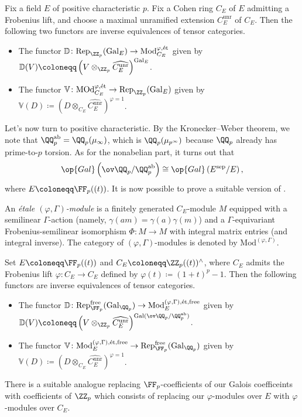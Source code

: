 \documentclass{article}
\begin{document}
\begin{theorem}
	Fix a field $E$ of positive characteristic $p$. Fix a Cohen ring $C_E$ of $E$ admitting a Frobenius lift, and choose a maximal unramified extension $C_E^{\mathrm{unr}}$ of $C_E$. Then the following two functors are inverse equivalences of tensor categories.
	\begin{itemize}
		\item The functor $\mathbb D\colon\mathrm{Rep}_{\ZZ_p}(\mathrm{Gal}_E)\to\mathrm{Mod}_{C_E}^{\varphi,\mathrm{\acute et}}$ given by $\mathbb D(V)\coloneqq\left(V\otimes_{\ZZ_p}\widehat{C_E^{\mathrm{unr}}}\right)^{\mathrm{Gal}_E}$.
		\item The functor $\mathbb V\colon\mathrm{MOd}_{C_E}^{\varphi,\mathrm{\acute et}}\to\mathrm{Rep}_{\ZZ_p}(\mathrm{Gal}_E)$ given by $\mathbb V(D)\coloneqq\left(D\otimes_{C_E}\widehat{C_E^{\mathrm{unr}}}\right)^{\varphi=1}$.
	\end{itemize}
\end{theorem}
Let's now turn to positive characteristic. By the Kronecker--Weber theorem, we note that $\QQ_p^{\mathrm{ab}}=\QQ_p(\mu_\infty)$, which is $\QQ_p(\mu_{p^\infty})$ because $\QQ_p$ already has prime-to-$p$ torsion. As for the nonabelian part, it turns out that
\[\op{Gal}\left(\ov\QQ_p/\QQ_p^{\mathrm{ab}}\right)\cong\op{Gal}\left(E^{\mathrm{sep}}/E\right),\]
where $E\coloneqq\FF_p((t))$. It is now possible to prove a suitable version of .
\begin{definition}
	An \textit{\'etale $(\varphi,\Gamma)$-module} is a finitely generated $C_E$-module $M$ equipped with a semilinear $\Gamma$-action (namely, $\gamma(am)=\gamma(a)\gamma(m)$) and a $\Gamma$-equivariant Frobenius-semilinear isomorphism $\Phi\colon M\to M$ with integral matrix entries (and integral inverse). The category of $(\varphi,\Gamma)$-mod\-ules is denoted by $\mathrm{Mod}^{(\varphi,\Gamma)}$.
\end{definition}
\begin{theorem}
	Set $E\coloneqq\FF_p((t))$ and $C_E\coloneqq\ZZ_p((t))^{\land}$, where $C_E$ admits the Frobenius lift $\varphi\colon C_E\to C_E$ defined by $\varphi(t)\coloneqq(1+t)^p-1$. Then the following functors are inverse equivalences of tensor categories.
	\begin{itemize}
		\item The functor $\mathbb D\colon\mathrm{Rep}_{\FF_p}^{\mathrm{free}}(\mathrm{Gal}_{\QQ_p})\to\mathrm{Mod}_E^{(\varphi,\Gamma),\mathrm{\acute et},\mathrm{free}}$ given by $\mathbb D(V)\coloneqq\left(V\otimes_{\ZZ_p}\widehat{C_E^{\mathrm{unr}}}\right)^{\mathrm{Gal}(\ov\QQ_p/\QQ_p^{\mathrm{ab}})}$.
		\item The functor $\mathbb V\colon\mathrm{Mod}_E^{(\varphi,\Gamma),\mathrm{\acute et},\mathrm{free}}\to \mathrm{Rep}_{\FF_p}^{\mathrm{free}}(\mathrm{Gal}_{\QQ_p})$ given by $\mathbb V(D)\coloneqq\left(D\otimes_{C_E}\widehat{C_E^{\mathrm{unr}}}\right)^{\varphi=1}$.
	\end{itemize}
\end{theorem}
\begin{remark}
	There is a suitable analogue replacing $\FF_p$-coefficients of our Galois coefficeints with coefficients of $\ZZ_p$ which consists of replacing our $\varphi$-modules over $E$ with $\varphi$-modules over $C_E$.
\end{remark}
\end{document}
